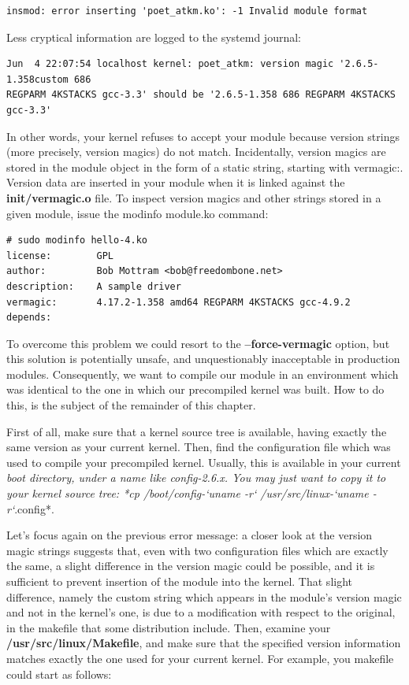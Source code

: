 \documentclass[11pt]{article}
\begin{document}
\begin{verbatim}
insmod: error inserting 'poet_atkm.ko': -1 Invalid module format
\end{verbatim}

Less cryptical information are logged to the systemd journal:

\begin{verbatim}
Jun  4 22:07:54 localhost kernel: poet_atkm: version magic '2.6.5-1.358custom 686
REGPARM 4KSTACKS gcc-3.3' should be '2.6.5-1.358 686 REGPARM 4KSTACKS gcc-3.3'
\end{verbatim}

In other words, your kernel refuses to accept your module because version strings (more precisely, version magics) do not match. Incidentally, version magics are stored in the module object in the form of a static string, starting with vermagic:. Version data are inserted in your module when it is linked against the \textbf{init/vermagic.o} file. To inspect version magics and other strings stored in a given module, issue the modinfo module.ko command:

\begin{verbatim}
# sudo modinfo hello-4.ko
license:        GPL
author:         Bob Mottram <bob@freedombone.net>
description:    A sample driver
vermagic:       4.17.2-1.358 amd64 REGPARM 4KSTACKS gcc-4.9.2
depends:
\end{verbatim}

To overcome this problem we could resort to the \textbf{--force-vermagic} option, but this solution is potentially unsafe, and unquestionably inacceptable in production modules. Consequently, we want to compile our module in an environment which was identical to the one in which our precompiled kernel was built. How to do this, is the subject of the remainder of this chapter.

First of all, make sure that a kernel source tree is available, having exactly the same version as your current kernel. Then, find the configuration file which was used to compile your precompiled kernel. Usually, this is available in your current \emph{boot directory, under a name like config-2.6.x. You may just want to copy it to your kernel source tree: *cp /boot/config-`uname -r` /usr/src/linux-`uname -r`}.config*.

Let's focus again on the previous error message: a closer look at the version magic strings suggests that, even with two configuration files which are exactly the same, a slight difference in the version magic could be possible, and it is sufficient to prevent insertion of the module into the kernel. That slight difference, namely the custom string which appears in the module's version magic and not in the kernel's one, is due to a modification with respect to the original, in the makefile that some distribution include. Then, examine your \textbf{/usr/src/linux/Makefile}, and make sure that the specified version information matches exactly the one used for your current kernel. For example, you makefile could start as follows:
\end{document}

